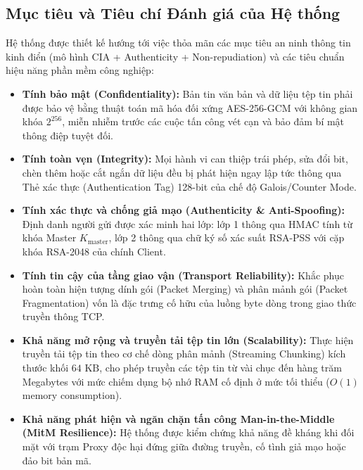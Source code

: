 \documentclass[a4paper,12pt]{article}
\begin{document}
\subsection{Mục tiêu và Tiêu chí Đánh giá của Hệ thống}
Hệ thống được thiết kế hướng tới việc thỏa mãn các mục tiêu an ninh thông tin kinh điển (mô hình CIA + Authenticity + Non-repudiation) và các tiêu chuẩn hiệu năng phần mềm công nghiệp:
\begin{itemize}
    \item \textbf{Tính bảo mật (Confidentiality):} Bản tin văn bản và dữ liệu tệp tin phải được bảo vệ bằng thuật toán mã hóa đối xứng AES-256-GCM với không gian khóa $2^{256}$, miễn nhiễm trước các cuộc tấn công vét cạn và bảo đảm bí mật thông điệp tuyệt đối.
    \item \textbf{Tính toàn vẹn (Integrity):} Mọi hành vi can thiệp trái phép, sửa đổi bit, chèn thêm hoặc cắt ngắn dữ liệu đều bị phát hiện ngay lập tức thông qua Thẻ xác thực (Authentication Tag) 128-bit của chế độ Galois/Counter Mode.
    \item \textbf{Tính xác thực và chống giả mạo (Authenticity \& Anti-Spoofing):} Định danh người gửi được xác minh hai lớp: lớp 1 thông qua HMAC tính từ khóa Master $K_{\text{master}}$, lớp 2 thông qua chữ ký số xác suất RSA-PSS với cặp khóa RSA-2048 của chính Client.
    \item \textbf{Tính tin cậy của tầng giao vận (Transport Reliability):} Khắc phục hoàn toàn hiện tượng dính gói (Packet Merging) và phân mảnh gói (Packet Fragmentation) vốn là đặc trưng cố hữu của luồng byte dòng trong giao thức truyền thông TCP.
    \item \textbf{Khả năng mở rộng và truyền tải tệp tin lớn (Scalability):} Thực hiện truyền tải tệp tin theo cơ chế dòng phân mảnh (Streaming Chunking) kích thước khối $64\text{ KB}$, cho phép truyền các tệp tin từ vài chục đến hàng trăm Megabytes với mức chiếm dụng bộ nhớ RAM cố định ở mức tối thiểu ($O(1)$ memory consumption).
    \item \textbf{Khả năng phát hiện và ngăn chặn tấn công Man-in-the-Middle (MitM Resilience):} Hệ thống được kiểm chứng khả năng đề kháng khi đối mặt với trạm Proxy độc hại đứng giữa đường truyền, cố tình giả mạo hoặc đảo bit bản mã.
\end{itemize}
\end{document}
